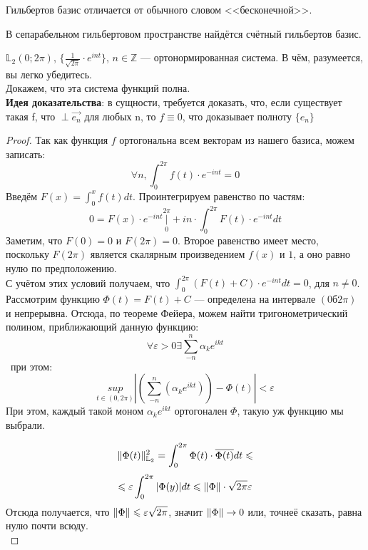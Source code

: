 \documentclass[12pt]{article}
\begin{document}
	{\color{gray} Гильбертов базис отличается от обычного словом <<бесконечной>>.}
	
	\begin{state}
		В сепарабельном гильбертовом пространстве найдётся счётный гильбертов базис.
	\end{state}
	
	\example $\mathbb{L}_2 (0; 2\pi)$, $\{ \frac{1}{\sqrt{2\pi}} \cdot e^{int} \}$, $n \in \mathbb{Z}$ --- ортонормированная система.
	{\color{gray} В чём, разумеется, вы легко убедитесь.}\\
	Докажем, что эта система функций полна.\\
	\textbf{Идея доказательства}: в сущности, требуется доказать, что, если существует такая f, что $\perp \vec{e_n}$
	для любых n, то $f \equiv 0$, что доказывает полноту $\{ e_n \}$
	\begin{proof}
		Так как функция $f$ ортогональна всем векторам из нашего базиса, можем записать:
		$$ \forall n, \int_0^{2\pi} f(t) \cdot e^{-int} = 0 $$
		Введём $F(x) = \int_0^x f(t) dt$. Проинтегрируем равенство по частям:
		$$ 0 = F(x) \cdot e^{-int} \underset{0}{\overset{{2\pi}}{|}} + i n \cdot \int_0^{2\pi} F(t) \cdot e^{-int} dt $$
		Заметим, что $F(0) = 0$ и $F(2\pi) = 0$. Второе равенство имеет место, поскольку $F(2\pi)$ является 
        скалярным произведением $f(x)$ и $1$, а оно равно нулю по предположению. \\
		С учётом этих условий получаем, что $\int_0^{2\pi} (F(t) + C) \cdot e^{-int} dt = 0$, для $n \neq 0$. \\
		Рассмотрим функцию $\Phi(t) = F(t) + C$ --- определена на интервале $(0б 2\pi)$ и непрерывна.
		Отсюда, по теореме Фейера, можем найти тригонометрический полином, приближающий данную функцию:
		$$\forall \varepsilon > 0 \exists \sum_{-n}^n \alpha_k e^{ikt}$$\
		при этом:
		$$ \underset{t \in (0,2\pi)}{sup} | (\sum_{-n}^n (\alpha_k e^{ikt})) - \Phi(t)| < \varepsilon $$
		При этом, каждый такой моном $\alpha_k e^{ikt}$ ортогонален $\Phi$, такую уж функцию мы выбрали.
		
		$$ \| \Phi(t) \|^2_{\mathbb{L}_2} = \int_0^{2\pi} \Phi(t) \cdot \overline{\Phi(t)} dt \leqslant $$
		$$ \leqslant \varepsilon \int_0^{2\pi} | \Phi(y) | dt \leqslant \| \Phi \| \cdot \sqrt{2\pi} \varepsilon $$
		Отсюда получается, что $\| \Phi \| \leqslant \varepsilon \sqrt{2\pi}$, значит $\| \Phi \| \rightarrow 0$ или, точнеё сказать,
		равна нулю почти всюду.\\
	\end{proof}
	
\end{document}
